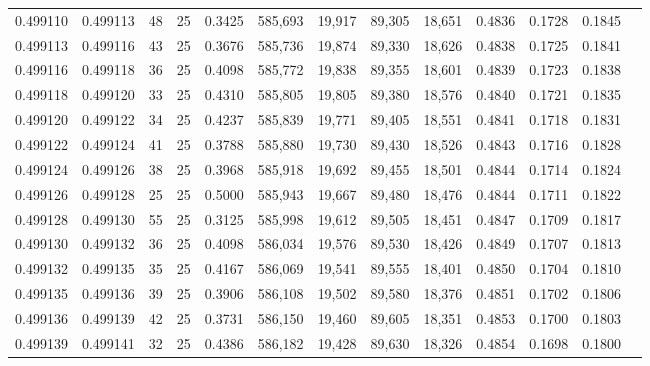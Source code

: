 \begin{tabular}{rrrrrrrrrrrrr}
0.499110 & 0.499113 &    48 &  25 &                                     0.3425 & 585,693 &  19,917 &  89,305 &  18,651 & 0.4836 & 0.1728 & 0.1845 \\
0.499113 & 0.499116 &    43 &  25 &                                     0.3676 & 585,736 &  19,874 &  89,330 &  18,626 & 0.4838 & 0.1725 & 0.1841 \\
0.499116 & 0.499118 &    36 &  25 &                                     0.4098 & 585,772 &  19,838 &  89,355 &  18,601 & 0.4839 & 0.1723 & 0.1838 \\
0.499118 & 0.499120 &    33 &  25 &                                     0.4310 & 585,805 &  19,805 &  89,380 &  18,576 & 0.4840 & 0.1721 & 0.1835 \\
0.499120 & 0.499122 &    34 &  25 &                                     0.4237 & 585,839 &  19,771 &  89,405 &  18,551 & 0.4841 & 0.1718 & 0.1831 \\
0.499122 & 0.499124 &    41 &  25 &                                     0.3788 & 585,880 &  19,730 &  89,430 &  18,526 & 0.4843 & 0.1716 & 0.1828 \\
0.499124 & 0.499126 &    38 &  25 &                                     0.3968 & 585,918 &  19,692 &  89,455 &  18,501 & 0.4844 & 0.1714 & 0.1824 \\
0.499126 & 0.499128 &    25 &  25 &                                     0.5000 & 585,943 &  19,667 &  89,480 &  18,476 & 0.4844 & 0.1711 & 0.1822 \\
0.499128 & 0.499130 &    55 &  25 &                                     0.3125 & 585,998 &  19,612 &  89,505 &  18,451 & 0.4847 & 0.1709 & 0.1817 \\
0.499130 & 0.499132 &    36 &  25 &                                     0.4098 & 586,034 &  19,576 &  89,530 &  18,426 & 0.4849 & 0.1707 & 0.1813 \\
0.499132 & 0.499135 &    35 &  25 &                                     0.4167 & 586,069 &  19,541 &  89,555 &  18,401 & 0.4850 & 0.1704 & 0.1810 \\
0.499135 & 0.499136 &    39 &  25 &                                     0.3906 & 586,108 &  19,502 &  89,580 &  18,376 & 0.4851 & 0.1702 & 0.1806 \\
0.499136 & 0.499139 &    42 &  25 &                                     0.3731 & 586,150 &  19,460 &  89,605 &  18,351 & 0.4853 & 0.1700 & 0.1803 \\
0.499139 & 0.499141 &    32 &  25 &                                     0.4386 & 586,182 &  19,428 &  89,630 &  18,326 & 0.4854 & 0.1698 & 0.1800 \\

\end{tabular}
